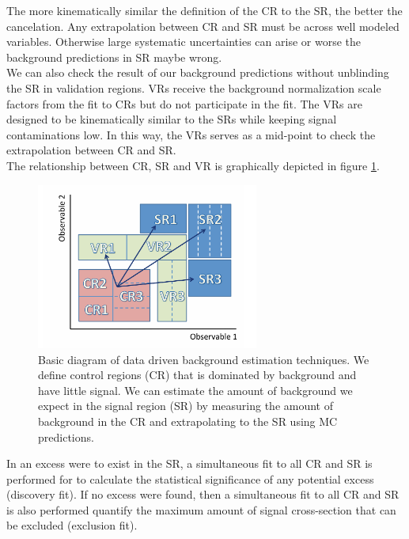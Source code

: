 \indent The more kinematically similar the definition of the CR to the SR, the better the cancelation.  Any extrapolation between CR and SR must be across well modeled variables.  Otherwise large systematic uncertainties can arise or worse the background predictions in SR maybe wrong.  \\

\indent We can also check the result of our background predictions without unblinding the SR in validation regions.  VRs receive the background normalization scale factors from the fit to CRs but do not participate in the fit.   The VRs are designed to be kinematically similar to the SRs while keeping signal contaminations low.  In this way, the VRs serves as a mid-point to check the extrapolation between CR and SR.  \\

\indent The relationship between CR, SR and VR is graphically depicted in figure \ref{fig:CR_VR_SR_stat}. \\

\begin{figure}[h!]
  \centering
	\includegraphics[width=0.65\textwidth]{./figures/statistics/CR_VR_SR.pdf}
\caption{\label{fig:CR_VR_SR_stat}{Basic diagram of data driven background estimation techniques.  We define control regions (CR) that is dominated by background and have little signal.  We can estimate the amount of background we expect in the signal region (SR) by measuring the amount of background in the CR and extrapolating to the SR using MC predictions. }}
\end{figure}

\indent In an excess were to exist in the SR, a simultaneous fit to all CR and SR is performed for to calculate the statistical significance of any potential excess (discovery fit).   If no excess were found, then a simultaneous fit to all CR and SR is also performed quantify the maximum amount of signal cross-section that can be excluded (exclusion fit).  \\

